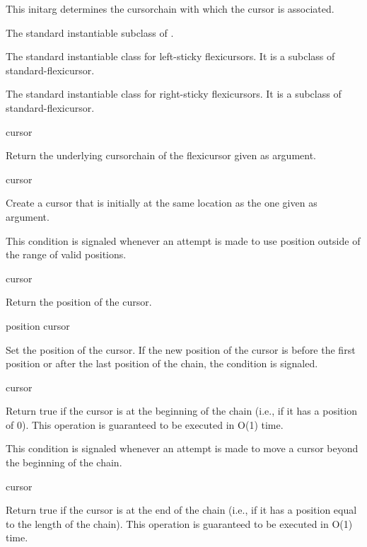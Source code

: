 \documentclass[11pt]{article}
\begin{document}
This initarg determines the cursorchain with which the cursor is associated.


The standard instantiable subclass of .


The standard instantiable class for left-sticky flexicursors.  It is a
subclass of standard-flexicursor.


The standard instantiable class for right-sticky flexicursors.  It is a
subclass of standard-flexicursor.

 {cursor}

Return the underlying cursorchain of the flexicursor given
as argument.

 {cursor}

Create a cursor that is initially at the same location as the one
given as argument.


This condition is signaled whenever an attempt is made to use position
outside of the range of valid positions.

 {cursor}

Return the position of the cursor.

 {position cursor}

Set the position of the cursor.  If the new position of the cursor is
before the first position or after the last position of the chain, the
condition  is signaled.

 {cursor}

Return true if the cursor is at the beginning of the chain (i.e., if
it has a position of 0).  This operation is guaranteed to be executed
in O(1) time.


This condition is signaled whenever an attempt is made to move a
cursor beyond the beginning of the chain.

 {cursor}

Return true if the cursor is at the end of the chain (i.e., if it has
a position equal to the length of the chain).  This operation is
guaranteed to be executed in O(1) time.

\end{document}
